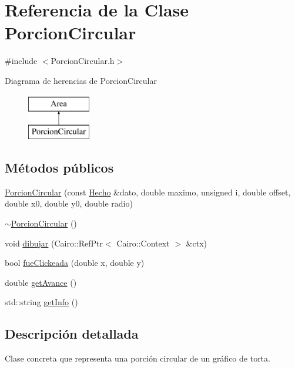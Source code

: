 \hypertarget{classPorcionCircular}{\section{\-Referencia de la \-Clase \-Porcion\-Circular}
\label{classPorcionCircular}
}


{\ttfamily \#include $<$\-Porcion\-Circular.\-h$>$}

\-Diagrama de herencias de \-Porcion\-Circular\begin{figure}[H]
\begin{center}
\leavevmode
\includegraphics[height=2.000000cm]{classPorcionCircular}
\end{center}
\end{figure}
\subsection*{\-Métodos públicos}
\begin{DoxyCompactItemize}
\item 
\hyperlink{classPorcionCircular_a08265d1aa799ee7aa5e3397b6db44fa0}{\-Porcion\-Circular} (const \hyperlink{classHecho}{\-Hecho} \&dato, double maximo, unsigned i, double offset, double x0, double y0, double radio)
\item 
\hyperlink{classPorcionCircular_a91aa83bdf942a5e63a5eface222c4c2d}{$\sim$\-Porcion\-Circular} ()
\item 
void \hyperlink{classPorcionCircular_a88b4c95825dd491a343576dbe6e00496}{dibujar} (\-Cairo\-::\-Ref\-Ptr$<$ \-Cairo\-::\-Context $>$ \&ctx)
\item 
bool \hyperlink{classPorcionCircular_aa39b24dbc7966b5b44c65e85eb389a71}{fue\-Clickeada} (double x, double y)
\item 
double \hyperlink{classPorcionCircular_ac92b4a76e251f16006f06419354f28d7}{get\-Avance} ()
\item 
std\-::string \hyperlink{classPorcionCircular_ae19f4777d0f9b0ed31e9305783e34a40}{get\-Info} ()
\end{DoxyCompactItemize}


\subsection{\-Descripción detallada}
\-Clase concreta que representa una porción circular de un gráfico de torta. 

